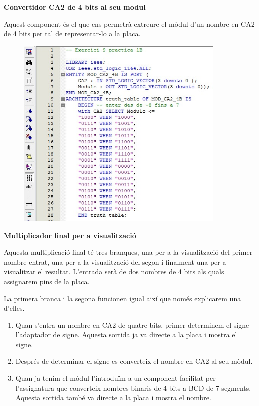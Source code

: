 \documentclass[12pt, a4papre]{article}
\begin{document}
	\textbf{\large{Convertidor CA2 de 4 bits al seu modul}}
	
	Aquest component és el que ens permetrà extreure el mòdul d'un nombre en CA2 de 4 bits per tal de representar-lo a la placa.
	
	\begin{center}
	\begin{figure}[H]
		\begin{center}
		\includegraphics[width=100mm]{ConvCA2_4aMOD.jpeg}
		\end{center}
	\end{figure}
	
	\end{center}
	
	\textbf{\large{Multiplicador final per a visualització}}
	
	Aquesta multiplicació final té tres branques, una per a la visualització del primer nombre entrat, una per a la visualització del segon i finalment una per a visualitzar el resultat. L'entrada serà de dos nombres de 4 bits als quals assignarem pins de la placa.
	
	La primera branca i la segona funcionen igual així que només explicarem una d'elles. 
	\begin{enumerate}
	\item Quan s'entra un nombre en CA2 de quatre bits, primer determinem el signe  l'adaptador de signe. Aquesta sortida ja va directe a la placa i mostra el signe.
	\item Després de determinar el signe es converteix el nombre en CA2 al seu mòdul.
	\item Quan ja tenim el mòdul l'introduïm a un component facilitat per l'assignatura que converteix nombres binaris de 4 bits a BCD de 7 segments. Aquesta sortida també va directe a la placa i mostra el nombre.
	\end{enumerate}
	
\end{document}
